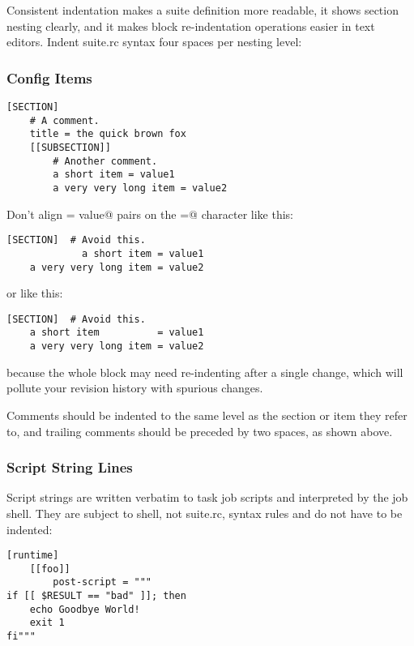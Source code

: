 Consistent indentation makes a suite definition more readable, it shows section
nesting clearly, and it makes block re-indentation operations easier in text
editors. Indent suite.rc syntax four spaces per nesting level:

\subsubsection{Config Items}

\lstset{language=suiterc}
\begin{lstlisting}
[SECTION]
    # A comment.
    title = the quick brown fox
    [[SUBSECTION]]
        # Another comment.
        a short item = value1
        a very very long item = value2
\end{lstlisting}

Don't align \lstinline@item = value@ pairs on the \lstinline@=@ character
like this:

\lstset{language=suiterc}
\begin{lstlisting}
[SECTION]  # Avoid this.
             a short item = value1
    a very very long item = value2
\end{lstlisting}

or like this:

\lstset{language=suiterc}
\begin{lstlisting}
[SECTION]  # Avoid this.
    a short item          = value1
    a very very long item = value2
\end{lstlisting}

because the whole block may need re-indenting after a single change, which will
pollute your revision history with spurious changes.

Comments should be indented to the same level as the section or item they refer
to, and trailing comments should be preceded by two spaces, as shown above.

\subsubsection{Script String Lines}

Script strings are written verbatim to task job scripts and interpreted by the
job shell. They are subject to shell, not suite.rc, syntax rules and do not
have to be indented:

\lstset{language=suiterc}
\begin{lstlisting}
[runtime]
    [[foo]]
        post-script = """
if [[ $RESULT == "bad" ]]; then
    echo Goodbye World!
    exit 1
fi"""
\end{lstlisting}

